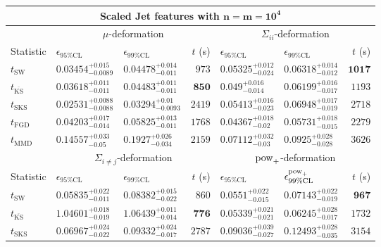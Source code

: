 \begin{tabular}{l|llr|llr}
	\toprule
	\multicolumn{7}{c}{{\bf Scaled Jet features with $\mathbf{n=m=10^{4}}$}} \\
	\toprule
	\multicolumn{1}{c}{} & \multicolumn{3}{c}{$\mu$-deformation} & \multicolumn{3}{c}{$\Sigma_{ii}$-deformation} \\
	Statistic & $\epsilon_{95\%\mathrm{CL}}$ & $\epsilon_{99\%\mathrm    {CL}}$ & $t$ (s) & $\epsilon_{95\%\mathrm{CL}}$ & $\epsilon_{99\%\mathrm{CL}}$ & $t$ (s) \\
	\midrule
	$t_{\mathrm{SW}}$ & $0.03454_{-0.0089}^{+0.015}$ & $0.04478_{-0.011}^{+0.014}$ & $973$ & $0.05325_{-0.024}^{+0.012}$ & $0.06318_{-0.012}^{+0.014}$ & ${\mathbf{1017}}$ \\
	$t_{\overline{\mathrm{KS}}}$ & $0.03618_{-0.011}^{+0.011}$ & $0.04483_{-0.011}^{+0.011}$ & ${\mathbf{850}}$ & $0.049_{-0.014}^{+0.016}$ & $0.06199_{-0.017}^{+0.016}$ & $1193$ \\
	$t_{\mathrm{SKS}}$ & ${\mathbf{0.02531_{-0.0088}^{+0.0088}}}$ & ${\mathbf{0.03294_{-0.0093}^{+0.01}}}$ & $2419$ & $0.05413_{-0.023}^{+0.016}$ & $0.06948_{-0.019}^{+0.017}$ & $2718$ \\
	$t_{\mathrm{FGD}}$ & $0.04203_{-0.014}^{+0.017}$ & $0.05825_{-0.011}^{+0.013}$ & $1768$ & ${\mathbf{0.04367_{-0.02}^{+0.018}}}$ & ${\mathbf{0.05731_{-0.015}^{+0.018}}}$ & $2279$ \\
	$t_{\mathrm{MMD}}$ & $0.14557_{-0.05}^{+0.033}$ & $0.1927_{-0.034}^{+0.026}$ & $2159$ & $0.07112_{-0.03}^{+0.032}$ & $0.0925_{-0.028}^{+0.028}$ & $3626$ \\
	\toprule
	\multicolumn{1}{c}{} & \multicolumn{3}{c}{$\Sigma_{i\neq j}$-deformation} & \multicolumn{3}{c}{$\rm{pow}_{+}$-deformation} \\
	Statistic & $\epsilon_{95\%\mathrm{CL}}$ & $\epsilon_{99\%\mathrm{CL}}$ & $t$ (s) & $\epsilon_{95\%\mathrm{CL}}$ & $\epsilon^{\rm   {pow}_{+}}_{99\%\mathrm{CL}}$ & $t$ (s) \\
	\midrule
	$t_{\mathrm{SW}}$ & $0.05835_{-0.011}^{+0.022}$ & $0.08382_{-0.022}^{+0.015}$ & $860$ & $0.0551_{-0.015}^{+0.022}$ & $0.07143_{-0.019}^{+0.022}$ & ${\mathbf{967}}$ \\
	$t_{\overline{\mathrm{KS}}}$ & $1.04601_{-0.019}^{+0.018}$ & $1.06439_{-0.014}^{+0.011}$ & ${\mathbf{776}}$ & $0.05339_{-0.021}^{+0.021}$ & $0.06245_{-0.017}^{+0.028}$ & $1732$ \\
	$t_{\mathrm{SKS}}$ & $0.06967_{-0.022}^{+0.024}$ & $0.09332_{-0.017}^{+0.024}$ & $2787$ & $0.09036_{-0.027}^{+0.039}$ & $0.12493_{-0.035}^{+0.028}$ & $3154$ \\

\end{tabular}
